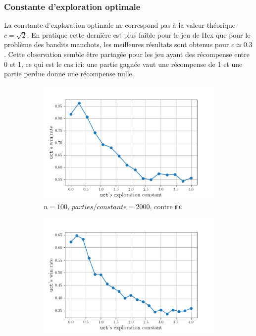\documentclass[a4paper]{article}
\theoremstyle{definition}
\begin{document}
\subsubsection{Constante d'exploration optimale}

La constante d'exploration optimale ne correspond pas à la valeur théorique $c=\sqrt{2}$. En pratique cette dernière est plus faible pour le jeu de Hex que pour le problème des bandits manchots, les meilleures résultats sont obtenus pour $c \simeq 0.3$. Cette observation semble être partagée pour les jeu ayant des récompense entre 0 et 1, ce qui est le cas ici: une partie gagnée vaut une récompense de 1 et une partie perdue donne une récompense nulle.

\begin{figure}[!h]
	\centering
	\begin{subfigure}{0.32\textwidth}
		\centering
		\includegraphics[width=\textwidth]{test1.png}
		\caption{$n=100$, $parties/constante = 2000$, contre \texttt{mc}}
		\label{fig:1_}
	\end{subfigure}
	\hfill
	\begin{subfigure}{0.32\textwidth}
		\centering
		\includegraphics[width=\textwidth]{test2.png}

\end{subfigure}
\end{figure}
\end{document}

